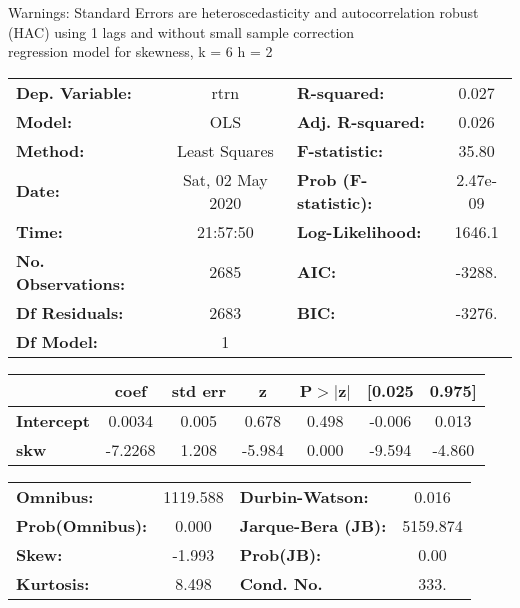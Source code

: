 Warnings: \newline
 [1] Standard Errors are heteroscedasticity and autocorrelation robust (HAC) using 1 lags and without small sample correction\\ 

regression model for skewness, k = 6 h = 2\begin{center}
\begin{tabular}{lclc}
\toprule
\textbf{Dep. Variable:}    &       rtrn       & \textbf{  R-squared:         } &     0.027   \\
\textbf{Model:}            &       OLS        & \textbf{  Adj. R-squared:    } &     0.026   \\
\textbf{Method:}           &  Least Squares   & \textbf{  F-statistic:       } &     35.80   \\
\textbf{Date:}             & Sat, 02 May 2020 & \textbf{  Prob (F-statistic):} &  2.47e-09   \\
\textbf{Time:}             &     21:57:50     & \textbf{  Log-Likelihood:    } &    1646.1   \\
\textbf{No. Observations:} &        2685      & \textbf{  AIC:               } &    -3288.   \\
\textbf{Df Residuals:}     &        2683      & \textbf{  BIC:               } &    -3276.   \\
\textbf{Df Model:}         &           1      & \textbf{                     } &             \\
\bottomrule
\end{tabular}
\begin{tabular}{lcccccc}
                   & \textbf{coef} & \textbf{std err} & \textbf{z} & \textbf{P$> |$z$|$} & \textbf{[0.025} & \textbf{0.975]}  \\
\midrule
\textbf{Intercept} &       0.0034  &        0.005     &     0.678  &         0.498        &       -0.006    &        0.013     \\
\textbf{skw}       &      -7.2268  &        1.208     &    -5.984  &         0.000        &       -9.594    &       -4.860     \\
\bottomrule
\end{tabular}
\begin{tabular}{lclc}
\textbf{Omnibus:}       & 1119.588 & \textbf{  Durbin-Watson:     } &    0.016  \\
\textbf{Prob(Omnibus):} &   0.000  & \textbf{  Jarque-Bera (JB):  } & 5159.874  \\
\textbf{Skew:}          &  -1.993  & \textbf{  Prob(JB):          } &     0.00  \\
\textbf{Kurtosis:}      &   8.498  & \textbf{  Cond. No.          } &     333.  \\
\bottomrule
\end{tabular}
\end{center}

